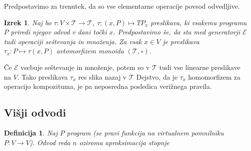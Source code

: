 \documentclass{article}
\newcommand{\E}{\mathcal{E}}
\newcommand{\T}{\mathcal{T}}
\newtheorem{definicija}{Definicija}[section]
\newtheorem{izrek}{Izrek}[section]
\begin{document}
Predpostavimo za trenutek, da so vse elementarne operacije povsod odvedljive. 

\begin{izrek}
  Naj bo $\tau:V\times \T\to \T$, $\tau:(x,P)\mapsto TP_x$ preslikava,  ki vsakemu programu
  $P$ priredi njegov odvod v dani točki $x$. Predpostavimo še, da sta med generatorji $\E$
  tudi operaciji seštevanja in množenja. Za vsak $x\in V$ je preslikava
  $\tau_x:P\mapsto \tau(x,P)$ avtomorfizem monoida $(\T,\circ)$. 
\end{izrek}
Če $\E$ vsebuje seštevanje in množenje, potem so v $\T$ tudi vse linearne preslikave
na $V$. Tako preslikava $\tau_x$ res slika nazaj v $\T$ Dejstvo, da je $\tau_x$ homomorfizem za operacijo kompozituma, je pa 
neposredna posledica verižnega pravila.
\subsection{Višji odvodi}
\begin{definicija}
Naj $P$ program (se pravi funkcija na virtualnem pomnilniku $P:V\to V$). Odvod
reda $n$ oziroma aproksimacija stopnje 
\end{definicija}
\end{document}
